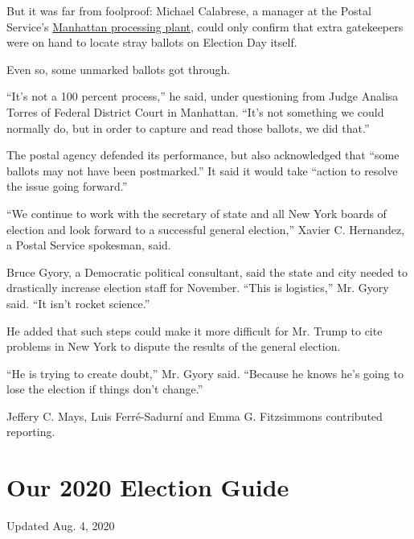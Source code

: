 But it was far from foolproof: Michael Calabrese, a manager at the
Postal Service's
\href{https://www.uspsoig.gov/document/new-york-morgan-processing-and-distribution-center-efficiency}{Manhattan
processing plant}, could only confirm that extra gatekeepers were on
hand to locate stray ballots on Election Day itself.

Even so, some unmarked ballots got through.

``It's not a 100 percent process,'' he said, under questioning from
Judge Analisa Torres of Federal District Court in Manhattan. ``It's not
something we could normally do, but in order to capture and read those
ballots, we did that.''

The postal agency defended its performance, but also acknowledged that
``some ballots may not have been postmarked.'' It said it would take
``action to resolve the issue going forward.''

``We continue to work with the secretary of state and all New York
boards of election and look forward to a successful general election,''
Xavier C. Hernandez, a Postal Service spokesman, said.

Bruce Gyory, a Democratic political consultant, said the state and city
needed to drastically increase election staff for November. ``This is
logistics,'' Mr. Gyory said. ``It isn't rocket science.''

He added that such steps could make it more difficult for Mr. Trump to
cite problems in New York to dispute the results of the general
election.

``He is trying to create doubt,'' Mr. Gyory said. ``Because he knows
he's going to lose the election if things don't change.''

Jeffery C. Mays, Luis Ferré-Sadurní and Emma G. Fitzsimmons contributed
reporting.

\hypertarget{our-2020-election-guide}{%
\section{Our 2020 Election Guide}\label{our-2020-election-guide}}

Updated Aug. 4, 2020

